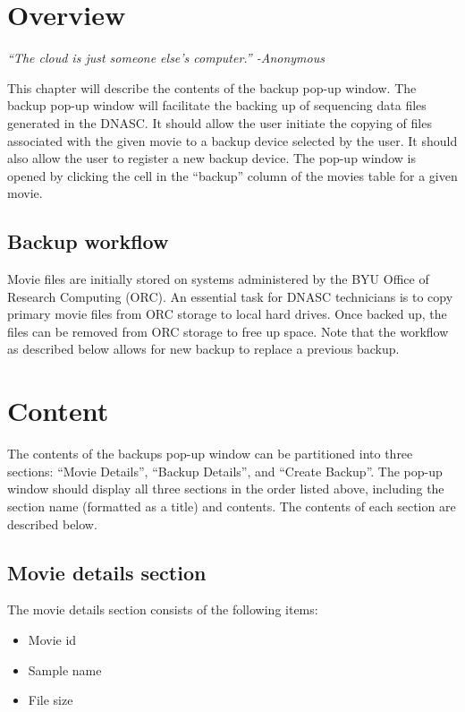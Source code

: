 
\section{Overview}

\vspace{3mm}
\emph{``The cloud is just someone else's computer.'' -Anonymous}
\vspace{3mm}

\noindent This chapter will describe the contents of the backup pop-up window.
The backup pop-up window will facilitate the backing up of sequencing data files 
generated in the DNASC. It should allow the user initiate the copying of
files associated with the given movie to a backup device selected by the user.
It should also allow the user to register a new backup device. The pop-up window 
is opened by clicking the cell in the ``backup'' column of the movies table for a 
given movie.

\subsection{Backup workflow}
Movie files are initially stored on systems administered by the BYU Office of 
Research Computing (ORC). An essential task for DNASC technicians is to copy primary 
movie files from ORC storage to local hard drives. Once backed up, the files can be 
removed from ORC storage to free up space. Note that the workflow as described below
allows for new backup to replace a previous backup.

\section{Content}

The contents of the backups pop-up window can be partitioned into three sections: 
``Movie Details'', ``Backup Details'', and ``Create Backup''. The pop-up window should 
display all three sections in the order listed above, including the section name 
(formatted as a title) and contents. The contents of each section are described below. 

\subsection{Movie details section}

The movie details section consists of the following items:
\begin{itemize}\itemsep1pt
  \item Movie id
  \item Sample name
  \item File size
\end{itemize}

